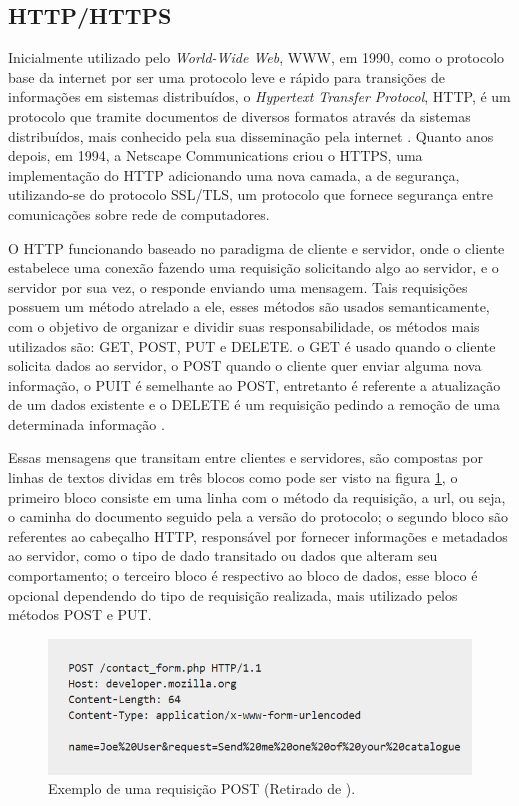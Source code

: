 \subsection{HTTP/HTTPS}
\label{fund:http}
Inicialmente utilizado pelo \textit{World-Wide Web}, WWW, em 1990, como o protocolo base da internet por ser uma protocolo leve e rápido para transições de informações em sistemas distribuídos, o \textit{Hypertext Transfer Protocol}, HTTP, é um protocolo que tramite documentos de diversos formatos através da sistemas distribuídos, mais conhecido pela sua disseminação pela internet \cite{berners1996hypertext}. Quanto anos depois, em 1994, a Netscape Communications criou o HTTPS, uma implementação do HTTP adicionando uma nova camada, a de segurança, utilizando-se do protocolo SSL/TLS, um protocolo que fornece segurança entre comunicações sobre rede de computadores.

O HTTP funcionando baseado no paradigma de cliente e servidor, onde o cliente estabelece uma conexão fazendo uma requisição solicitando algo ao servidor, e o servidor por sua vez, o responde enviando uma mensagem.  Tais requisições possuem um método atrelado a ele, esses métodos são usados semanticamente, com o objetivo de organizar e dividir suas responsabilidade, os métodos mais utilizados são: GET, POST, PUT e DELETE. o GET é usado quando o cliente solicita dados ao servidor, o POST quando o cliente quer enviar alguma nova informação, o PUIT é semelhante ao POST, entretanto é referente a atualização de um dados existente e o DELETE é um requisição pedindo a remoção de uma determinada informação \cite{mozilla2019http}.

Essas mensagens que transitam entre clientes e servidores, são compostas por linhas de textos dividas em três blocos como pode ser visto na figura \ref{fig:post-request}, o primeiro bloco consiste em uma linha com o método da requisição, a url, ou seja, o caminha do documento seguido pela a versão do protocolo; o segundo bloco são referentes ao cabeçalho HTTP, responsável por fornecer informações e metadados ao servidor, como o tipo de dado transitado ou dados que alteram seu comportamento; o terceiro bloco é respectivo ao bloco de dados, esse bloco é opcional dependendo do tipo de requisição realizada, mais utilizado pelos métodos POST e PUT.

\begin{figure}[H]
  \centering
  \includegraphics[width=.80\textwidth]{assets/post-request.png} 
  \caption{Exemplo de uma requisição POST (Retirado de \cite{mozilla2019http}).}
  \label{fig:post-request} 
\end{figure}


